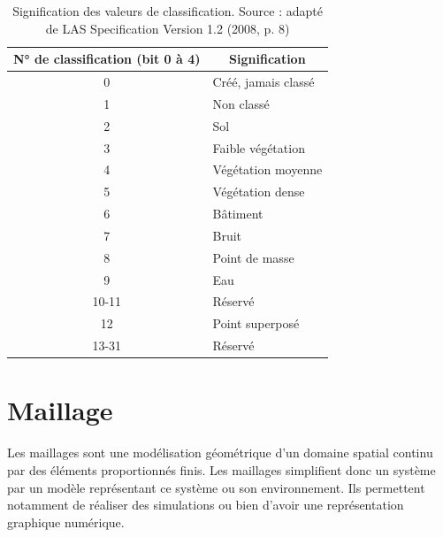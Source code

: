 \begin{table}[htbp!]
\centering
\begin{tabular}{|c|l|}
\hline
\textbf{N° de classification (bit 0 à 4)} & \multicolumn{1}{c|}{\textbf{Signification}} \\ \hline
0                                         & Créé, jamais classé                         \\ \hline
1                                         & Non classé                                  \\ \hline
2                                         & Sol                                         \\ \hline
3                                         & Faible végétation                           \\ \hline
4                                         & Végétation moyenne                          \\ \hline
5                                         & Végétation dense                            \\ \hline
6                                         & Bâtiment                                    \\ \hline
7                                         & Bruit                                       \\ \hline
8                                         & Point de masse                              \\ \hline
9                                         & Eau                                         \\ \hline
10-11                                     & Réservé                                     \\ \hline
12                                        & Point superposé                             \\ \hline
13-31                                     & Réservé                                     \\ \hline
\end{tabular}
\caption{Signification des valeurs de classification. Source : adapté de LAS Specification Version 1.2 (2008, p. 8)}
\label{tab:las_point_class_meaning}
\end{table}

\section{Maillage}
Les maillages sont une modélisation géométrique d'un domaine spatial continu
par des éléments proportionnés finis.
Les maillages simplifient donc un système par un modèle représentant ce système
ou son environnement. Ils permettent notamment de réaliser des simulations ou bien d'avoir
une représentation graphique numérique.

